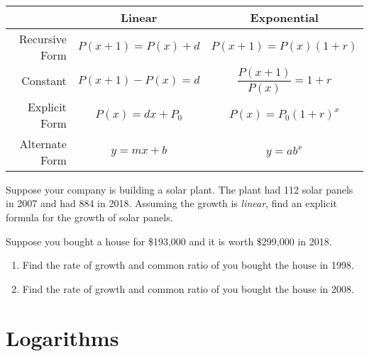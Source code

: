 \begin{center}
  {\renewcommand{\arraystretch}{2}
    \begin{tabular}[h!]{rcc}
      \toprule
      & Linear & Exponential \\
      \toprule
      Recursive Form & \(P(x+1) = P(x)+d\) & \(P(x+1) = P(x)(1+r)\) \\
      \midrule
      Constant & \(P(x+1) - P(x) = d\)  & \(\dfrac{P(x+1)}{P(x)} = 1+r\) \\
      \midrule
      Explicit Form & \(P(x) = dx + P_0\) & \(P(x) = P_0{(1+r)}^x \) \\
      \midrule
      Alternate Form & \(y = mx + b\) & \(y = a b^{x}\) \\
      \bottomrule
    \end{tabular}
  }
\end{center}

\begin{exercise}
  Suppose your company is building a solar plant. The plant had 112
  solar panels in 2007 and had 884 in 2018. Assuming the growth is
  \emph{linear}, find an explicit formula for the growth of solar
  panels.

\end{exercise}

\newpage

\begin{exercise}
  Suppose you bought a house for \$193,000 and it is worth \$299,000
  in 2018.

  \begin{enumerate}
  \item Find the rate of growth and common ratio of you bought the
    house in 1998.

  \item Find the rate of growth and common ratio of you bought the
    house in 2008.

  \end{enumerate}
\end{exercise}

\newpage

\section{Logarithms}%
\label{sec:logarithms}

